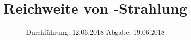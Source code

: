 
\setlength{\parindent}{0 pt}

\subject{V701}
\title{Reichweite von \alpha-Strahlung}
\date{%
  Durchführung: 12.06.2018
  \hspace{3em}
  Abgabe: 19.06.2018
}



\maketitle
\thispagestyle{empty}
\tableofcontents
\newpage






\printbibliography{}


